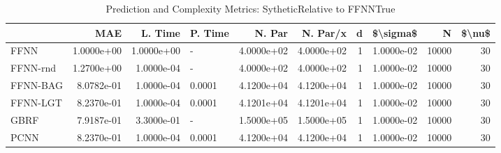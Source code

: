 \begin{table}
\centering
\caption{Prediction and Complexity Metrics: SytheticRelative to FFNNTrue}
\label{tab__Sythetic__Fix_Neurons_QTrue}
\begin{tabular}{lrrlrrrrrr}
\toprule
{} &        MAE &    L. Time & P. Time &     N. Par &   N. Par/x &  d &   \$\textbackslash sigma\$ &      N &  \$\textbackslash nu\$ \\
\midrule
FFNN     & 1.0000e+00 & 1.0000e+00 &       - & 4.0000e+02 & 4.0000e+02 &  1 & 1.0000e-02 &  10000 &     30 \\
FFNN-rnd & 1.2700e+00 & 1.0000e-04 &       - & 4.0000e+02 & 4.0000e+02 &  1 & 1.0000e-02 &  10000 &     30 \\
FFNN-BAG & 8.0782e-01 & 1.0000e-04 &  0.0001 & 4.1200e+04 & 4.1200e+04 &  1 & 1.0000e-02 &  10000 &     30 \\
FFNN-LGT & 8.2370e-01 & 1.0000e-04 &  0.0001 & 4.1201e+04 & 4.1201e+04 &  1 & 1.0000e-02 &  10000 &     30 \\
GBRF     & 7.9187e-01 & 3.3000e-01 &       - & 1.5000e+05 & 1.5000e+05 &  1 & 1.0000e-02 &  10000 &     30 \\
PCNN     & 8.2370e-01 & 1.0000e-04 &  0.0001 & 4.1200e+04 & 4.1200e+04 &  1 & 1.0000e-02 &  10000 &     30 \\
\bottomrule
\end{tabular}
\end{table}
